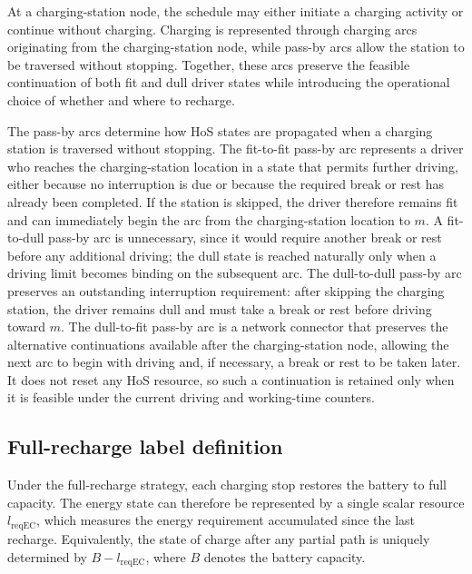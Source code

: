 \documentclass[3p,11pt,authoryear]{elsarticle}  %
\begin{document}
At a charging-station node, the schedule may either initiate a charging activity or continue without charging. Charging is represented through charging arcs originating from the charging-station node, while pass-by arcs allow the station to be traversed without stopping. Together, these arcs preserve the feasible continuation of both fit and dull driver states while introducing the operational choice of whether and where to recharge.

The pass-by arcs determine how HoS states are propagated when a charging station is traversed without stopping. The fit-to-fit pass-by arc represents a driver who reaches the charging-station location in a state that permits further driving, either because no interruption is due or because the required break or rest has already been completed. If the station is skipped, the driver therefore remains fit and can immediately begin the arc from the charging-station location to \(m\). A fit-to-dull pass-by arc is unnecessary, since it would require another break or rest before any additional driving; the dull state is reached naturally only when a driving limit becomes binding on the subsequent arc. The dull-to-dull pass-by arc preserves an outstanding interruption requirement: after skipping the charging station, the driver remains dull and must take a break or rest before driving toward \(m\). The dull-to-fit pass-by arc is a network connector that preserves the alternative continuations available after the charging-station node, allowing the next arc to begin with driving and, if necessary, a break or rest to be taken later. It does not reset any HoS resource, so such a continuation is retained only when it is feasible under the current driving and working-time counters.


\subsection{Full-recharge label definition}


Under the full-recharge strategy, each charging stop restores the battery to full capacity. The energy state can therefore be represented by a single scalar resource \(l_{\text{reqEC}}\), which measures the energy requirement accumulated since the last recharge. Equivalently, the state of charge after any partial path is uniquely determined by \(B-l_{\text{reqEC}}\), where \(B\) denotes the battery capacity.
\end{document}
